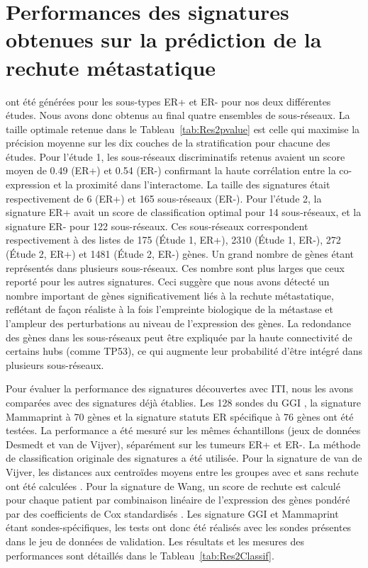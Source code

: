 		\section{\textcolor{green!45!black}{Performances des signatures obtenues sur la prédiction de la rechute métastatique}}
		 ont été générées pour les sous-types ER+ et ER- pour nos deux différentes études.
		Nous avons donc obtenus au final quatre ensembles de sous-réseaux.
		La taille optimale retenue dans le Tableau~\ref{tab:Res2pvalue} est celle qui maximise la précision moyenne sur les dix couches de la stratification pour chacune des études.
		Pour l'étude 1, les sous-réseaux discriminatifs retenus avaient un score moyen de 0.49 (ER+) et 0.54 (ER-) confirmant la haute corrélation entre la co-expression et la proximité dans l'interactome.
		La taille des signatures était respectivement de 6 (ER+) et 165 sous-réseaux (ER-).
		Pour l'étude 2, la signature ER+ avait un score de classification optimal pour 14 sous-réseaux, et la signature ER- pour 122 sous-réseaux.
		Ces sous-réseaux correspondent respectivement à des listes de 175 (Étude 1, ER+), 2310 (Étude 1, ER-), 272 (Étude 2, ER+) et 1481 (Étude 2, ER-) gènes.
		Un grand nombre de gènes étant représentés dans plusieurs sous-réseaux.
		Ces nombre sont plus larges que ceux reporté pour les autres signatures.
		Ceci suggère que nous avons détecté un nombre important de gènes significativement liés à la rechute métastatique, reflétant de façon réaliste à la fois l'empreinte biologique de la métastase et l'ampleur des perturbations au niveau de l'expression des gènes.
		La redondance des gènes dans les sous-réseaux peut être expliquée par la haute connectivité de certains hubs (comme \acs{TP53}), ce qui augmente leur probabilité d'être intégré dans plusieurs sous-réseaux.

		Pour évaluer la performance des signatures découvertes avec ITI, nous les avons comparées avec des signatures déjà établies.
		Les 128 sondes du \acs{GGI} \citep{Sotiriou2006}, la signature Mammaprint à 70 gènes \citep{vandevijver2002} et la signature statuts ER spécifique à 76 gènes \citep{Wang2005} ont été testées.
		La performance a été mesuré sur les mêmes échantillons (jeux de données Desmedt et van de Vijver), séparément sur les tumeurs ER+ et ER-.
		La méthode de classification originale des signatures a été utilisée.
		Pour la signature de van de Vijver, les distances aux centroïdes moyens entre les groupes avec et sans rechute ont été calculées \citep{vandevijver2002}.
		Pour la signature de Wang, un score de rechute est calculé pour chaque patient par combinaison linéaire de l'expression des gènes pondéré par des coefficients de Cox standardisés \citep{Wang2005}.
		Les signature GGI et Mammaprint étant sondes-spécifiques, les tests ont donc été réalisés avec les sondes présentes dans le jeu de données de validation.
		Les résultats et les mesures des performances sont détaillés dans le Tableau~\ref{tab:Res2Classif}.

